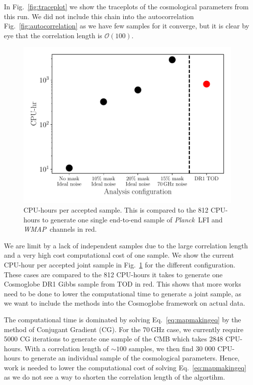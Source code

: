 \documentclass[twocolumn]{../common/aa}
\def\wmap{\emph{WMAP}}
\def\planck{\emph{Planck}}
\begin{document}
In Fig.~\ref{fig:traceplot} we show the traceplots of the cosmological parameters from this run. We did not include this chain into the autocorrelation Fig.~\ref{fig:autocorrelation} as we have few samples for it converge, but it is clear by eye that the correlation length is $\mathcal{O}(100)$.

\begin{figure}
	\centering
	\includegraphics[width=\linewidth]{figures/run_time.pdf}
	\caption{\label{fig:runtime}CPU-hours per accepted sample. This is compared to the 812 CPU-hours to generate one single end-to-end sample of \planck\ LFI and \wmap\ channels in red.}
\end{figure}

We are limit by a lack of independent samples due to the large correlation length and a very high cost computational cost of one sample. We show the current CPU-hour per accepted joint sample in Fig.~\ref{fig:runtime} for the different configuration. These cases are compared to the 812 CPU-hours it takes to generate one Cosmoglobe DR1 Gibbs sample from TOD in red. This shows that more works need to be done to lower the computational time to generate a joint sample, as we want to include the methods into the Cosmoglobe framework on actual data.

The computational time is dominated by solving Eq.~\eqref{eq:mapmakingeq} by the method of Conjugant Gradient (CG). For the 70\,GHz case, we currently require 5000 CG iterations to generate one sample of the CMB which takes 2848 CPU-hours. With a correlation length of $\sim 100$ samples, we then find 30 000 CPU-hours to generate an individual sample of the cosmological parameters. Hence, work is needed to lower the computational cost of solving Eq.~\eqref{eq:mapmakingeq} as we do not see a way to shorten the correlation length of the algortihm.
\end{document}
